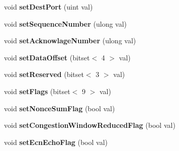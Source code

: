 \begin{DoxyCompactItemize}
\item 
\hypertarget{classwhisper__library_1_1TcpPacket_aa46587d82255938026c680ae7f1ebb4d}{void {\bfseries set\-Dest\-Port} (uint val)}\label{classwhisper__library_1_1TcpPacket_aa46587d82255938026c680ae7f1ebb4d}

\item 
\hypertarget{classwhisper__library_1_1TcpPacket_a4206184f0f44c0e0bec96981731028d3}{void {\bfseries set\-Sequence\-Number} (ulong val)}\label{classwhisper__library_1_1TcpPacket_a4206184f0f44c0e0bec96981731028d3}

\item 
\hypertarget{classwhisper__library_1_1TcpPacket_a1711e85c6c854e5cb0d62407937444b5}{void {\bfseries set\-Acknowlage\-Number} (ulong val)}\label{classwhisper__library_1_1TcpPacket_a1711e85c6c854e5cb0d62407937444b5}

\item 
\hypertarget{classwhisper__library_1_1TcpPacket_a7eb16c5a0a5ca42aaf58a4778a773f23}{void {\bfseries set\-Data\-Offset} (bitset$<$ 4 $>$ val)}\label{classwhisper__library_1_1TcpPacket_a7eb16c5a0a5ca42aaf58a4778a773f23}

\item 
\hypertarget{classwhisper__library_1_1TcpPacket_abaee2fa0893733ab11f8474cc6ff5937}{void {\bfseries set\-Reserved} (bitset$<$ 3 $>$ val)}\label{classwhisper__library_1_1TcpPacket_abaee2fa0893733ab11f8474cc6ff5937}

\item 
\hypertarget{classwhisper__library_1_1TcpPacket_ac07e1a77d993bcbcaf19c45d6f8d1b24}{void {\bfseries set\-Flags} (bitset$<$ 9 $>$ val)}\label{classwhisper__library_1_1TcpPacket_ac07e1a77d993bcbcaf19c45d6f8d1b24}

\item 
\hypertarget{classwhisper__library_1_1TcpPacket_ae5a20d3192aea8652484cce0418241a2}{void {\bfseries set\-Nonce\-Sum\-Flag} (bool val)}\label{classwhisper__library_1_1TcpPacket_ae5a20d3192aea8652484cce0418241a2}

\item 
\hypertarget{classwhisper__library_1_1TcpPacket_abf531b06fc13babbdde152d84dc95d58}{void {\bfseries set\-Congestion\-Window\-Reduced\-Flag} (bool val)}\label{classwhisper__library_1_1TcpPacket_abf531b06fc13babbdde152d84dc95d58}

\item 
\hypertarget{classwhisper__library_1_1TcpPacket_a62797c60cac6bf5193267b97fee5130f}{void {\bfseries set\-Ecn\-Echo\-Flag} (bool val)}\label{classwhisper__library_1_1TcpPacket_a62797c60cac6bf5193267b97fee5130f}


\end{DoxyCompactItemize}
